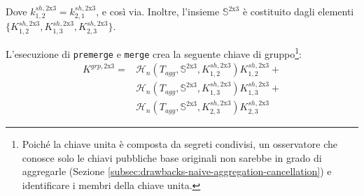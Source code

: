Dove $k^{sh,\textrm{2x3}}_{1,2} = k^{sh,\textrm{2x3}}_{2,1}$, e così via. Inoltre, l'insieme $\mathbb{S}^{\textrm{2x3}}$ è costituito dagli elementi $\{ K^{sh,\textrm{2x3}}_{1,2}, K^{sh,\textrm{2x3}}_{1,3}, K^{sh,\textrm{2x3}}_{2,3}\}$.

L'esecuzione di {\tt premerge} e {\tt merge} crea la seguente chiave di gruppo\footnote{Poiché la chiave unita è composta da segreti condivisi, un osservatore che conosce solo le chiavi pubbliche base originali non sarebbe in grado di aggregarle (Sezione \ref{subsec:drawbacks-naive-aggregation-cancellation}) e identificare i membri della chiave unita.}:\vspace{.175cm}
\begin{align*}
    K^{grp,\textrm{2x3}} = &\mathcal{H}_n(T_{agg},\mathbb{S}^{\textrm{2x3}},K^{sh,\textrm{2x3}}_{1,2}) K^{sh,\textrm{2x3}}_{1,2} + \\
                           &\mathcal{H}_n(T_{agg},\mathbb{S}^{\textrm{2x3}},K^{sh,\textrm{2x3}}_{1,3}) K^{sh,\textrm{2x3}}_{1,3} + \\
                           &\mathcal{H}_n(T_{agg},\mathbb{S}^{\textrm{2x3}},K^{sh,\textrm{2x3}}_{2,3}) K^{sh,\textrm{2x3}}_{2,3}
\end{align*}

